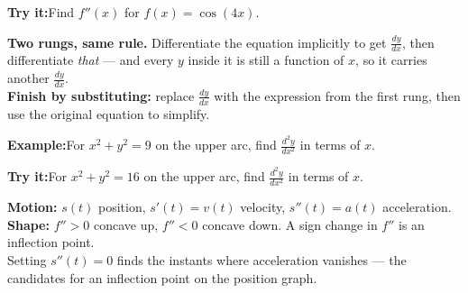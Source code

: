 \documentclass[12pt]{article}
\begin{document}
\begin{tryitbox}
\textbf{Try it:}\quad Find $f''(x)$ for $f(x) = \cos(4x)$.\\[2pt]
\end{tryitbox}


\begin{formulabox}
\textbf{Two rungs, same rule.} Differentiate the equation implicitly to get
$\frac{dy}{dx}$, then differentiate \emph{that} --- and every $y$ inside it is
still a function of $x$, so it carries another $\frac{dy}{dx}$.\\[3pt]
\textbf{Finish by substituting:} replace $\frac{dy}{dx}$ with the expression
from the first rung, then use the original equation to simplify.
\end{formulabox}

\begin{examplebox}
\textbf{Example:}\quad For $x^2 + y^2 = 9$ on the upper arc, find
$\frac{d^2y}{dx^2}$ in terms of $x$.
\end{examplebox}

\begin{tryitbox}
\textbf{Try it:}\quad For $x^2 + y^2 = 16$ on the upper arc, find
$\frac{d^2y}{dx^2}$ in terms of $x$.\\[2pt]
\end{tryitbox}


\begin{formulabox}
\textbf{Motion:} $s(t)$ position, $s'(t) = v(t)$ velocity,
$s''(t) = a(t)$ acceleration.\\[3pt]
\textbf{Shape:} $f'' > 0$ concave up, $f'' < 0$ concave down. A sign change in
$f''$ is an inflection point.\\[3pt]
Setting $s''(t) = 0$ finds the instants where acceleration vanishes --- the
candidates for an inflection point on the position graph.
\end{formulabox}
\end{document}
